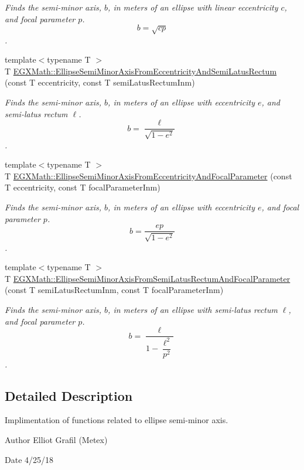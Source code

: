 \begin{DoxyCompactItemize}
\begin{DoxyCompactList}\small\item\em Finds the semi-\/minor axis, $b$, in meters of an ellipse with linear eccentricity $c$, and focal parameter $p$. \[ b=\sqrt{c p} \]. \end{DoxyCompactList}\item 
{\footnotesize template$<$typename T $>$ }\\T \mbox{\hyperlink{group___e_g_x_math-_geometry-2_d-_ellipse-_semi_minor_axis_ga1194f5481c66c492147a27b9e167df4f}{E\+G\+X\+Math\+::\+Ellipse\+Semi\+Minor\+Axis\+From\+Eccentricity\+And\+Semi\+Latus\+Rectum}} (const T eccentricity, const T semi\+Latus\+Rectum\+Inm)
\begin{DoxyCompactList}\small\item\em Finds the semi-\/minor axis, $b$, in meters of an ellipse with eccentricity $e$, and semi-\/latus rectum $\ell$. \[ b=\dfrac{\ell}{\sqrt{1 - e^2}} \]. \end{DoxyCompactList}\item 
{\footnotesize template$<$typename T $>$ }\\T \mbox{\hyperlink{group___e_g_x_math-_geometry-2_d-_ellipse-_semi_minor_axis_ga7bfc286b245acfcfd6c6bce85d25cdbb}{E\+G\+X\+Math\+::\+Ellipse\+Semi\+Minor\+Axis\+From\+Eccentricity\+And\+Focal\+Parameter}} (const T eccentricity, const T focal\+Parameter\+Inm)
\begin{DoxyCompactList}\small\item\em Finds the semi-\/minor axis, $b$, in meters of an ellipse with eccentricity $e$, and focal parameter $p$. \[ b=\dfrac{ep}{\sqrt{1 - e^2}} \]. \end{DoxyCompactList}\item 
{\footnotesize template$<$typename T $>$ }\\T \mbox{\hyperlink{group___e_g_x_math-_geometry-2_d-_ellipse-_semi_minor_axis_gafe27ed64ba521ec3cf8557520cbc6a14}{E\+G\+X\+Math\+::\+Ellipse\+Semi\+Minor\+Axis\+From\+Semi\+Latus\+Rectum\+And\+Focal\+Parameter}} (const T semi\+Latus\+Rectum\+Inm, const T focal\+Parameter\+Inm)
\begin{DoxyCompactList}\small\item\em Finds the semi-\/minor axis, $b$, in meters of an ellipse with semi-\/latus rectum $\ell$, and focal parameter $p$. \[ b=\dfrac{\ell}{1-\dfrac{\ell^2}{p^2}} \]. \end{DoxyCompactList}\end{DoxyCompactItemize}


\subsection{Detailed Description}
Implimentation of functions related to ellipse semi-\/minor axis. 

\begin{DoxyAuthor}{Author}
Elliot Grafil (Metex) 
\end{DoxyAuthor}
\begin{DoxyDate}{Date}
4/25/18 
\end{DoxyDate}
